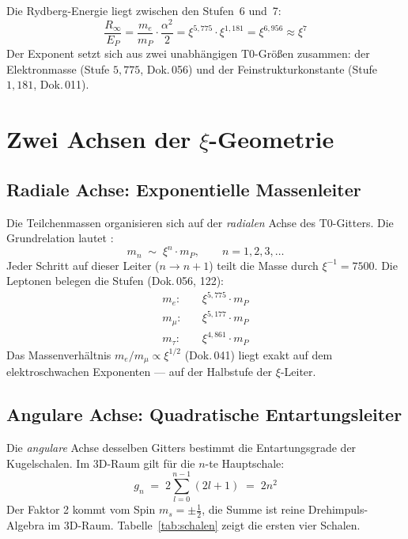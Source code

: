 Die Rydberg-Energie liegt zwischen den Stufen~6 und~7:
\begin{equation}
  \frac{R_\infty}{E_P}
  = \frac{m_e}{m_P} \cdot \frac{\alpha^2}{2}
  = \xi^{5{,}775} \cdot \xi^{1{,}181}
  = \xi^{6{,}956}
  \approx \xi^7
\end{equation}
Der Exponent setzt sich aus zwei unabhängigen T0-Größen zusammen:
der Elektronmasse (Stufe $5{,}775$, Dok.\,056) und der Feinstrukturkonstante
(Stufe $1{,}181$, Dok.\,011).

\section{Zwei Achsen der \texorpdfstring{$\xi$}{xi}-Geometrie}
\label{sec:zwei-achsen}

\subsection{Radiale Achse: Exponentielle Massenleiter}
\label{subsec:radial}

Die Teilchenmassen organisieren sich auf der \emph{radialen} Achse des
T0-Gitters. Die Grundrelation lautet \cite{dok009}:
\begin{equation}
  m_n \;\sim\; \xi^{n} \cdot m_P, \qquad n = 1, 2, 3, \ldots
\end{equation}
Jeder Schritt auf dieser Leiter ($n \to n+1$) teilt die Masse durch
$\xi^{-1} = 7500$.
Die Leptonen belegen die Stufen (Dok.\,056, 122):
\begin{align}
  m_e:  &\quad \xi^{5{,}775} \cdot m_P \\
  m_\mu:&\quad \xi^{5{,}177} \cdot m_P \\
  m_\tau:&\quad \xi^{4{,}861} \cdot m_P
\end{align}
Das Massenverhältnis $m_e/m_\mu \propto \xi^{1/2}$ (Dok.\,041) liegt
exakt auf dem elektroschwachen Exponenten — auf der Halbstufe der
$\xi$-Leiter.

\subsection{Angulare Achse: Quadratische Entartungsleiter}
\label{subsec:angular}

Die \emph{angulare} Achse desselben Gitters bestimmt die Entartungsgrade
der Kugelschalen. Im 3D-Raum gilt für die $n$-te Hauptschale:
\begin{equation}
  g_n \;=\; 2 \sum_{l=0}^{n-1} (2l+1) \;=\; 2n^2
  \label{eq:gn}
\end{equation}
Der Faktor 2 kommt vom Spin $m_s = \pm\frac{1}{2}$, die Summe ist reine
Drehimpuls-Algebra im 3D-Raum. Tabelle~\ref{tab:schalen} zeigt die ersten
vier Schalen.

